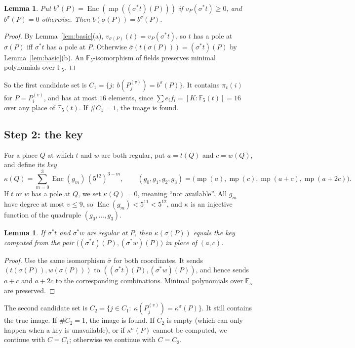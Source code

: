 \documentclass[11pt]{amsart}
\newtheorem{lemma}[theorem]{Lemma}
\theoremstyle{definition}
\theoremstyle{remark}
\newcommand{\F}{\mathbb{F}}
\newcommand{\minpoly}{\operatorname{mp}}
\newcommand{\Enc}{\operatorname{Enc}}
\begin{document}
\begin{lemma}\label{lem:bucket}
Put $b^\sigma(P)=\Enc(\minpoly((\sigma^*t)(P)))$ if $v_P(\sigma^*t)\ge0$, and $b^\sigma(P)=0$ otherwise. Then $b(\sigma(P))=b^\sigma(P)$.
\end{lemma}

\begin{proof}
By Lemma~\ref{lem:basic}(a), $v_{\sigma(P)}(t)=v_P(\sigma^*t)$, so $t$ has a pole at $\sigma(P)$ iff $\sigma^*t$ has a pole at $P$. Otherwise $\bar\sigma(t(\sigma(P)))=(\sigma^*t)(P)$ by Lemma~\ref{lem:basic}(b). An $\F_5$-isomorphism of fields preserves minimal polynomials over $\F_5$.
\end{proof}

So the first candidate set is $C_1=\{j:\ b(P^{(v)}_j)=b^\sigma(P)\}$. It contains $\pi_v(i)$ for $P=P^{(v)}_i$, and has at most $16$ elements, since $\sum e_if_i=[K:\F_5(t)]=16$ over any place of $\F_5(t)$. If $\#C_1=1$, the image is found.

\subsection{Step 2: the key}
For a place $Q$ at which $t$ and $w$ are both regular, put $a=t(Q)$ and $c=w(Q)$, and define its \emph{key}
\[
\kappa(Q)=\sum_{m=0}^{3}\Enc(g_m)\,(5^{12})^{3-m},\qquad (g_0,g_1,g_2,g_3)=\bigl(\minpoly(a),\minpoly(c),\minpoly(a+c),\minpoly(a+2c)\bigr).
\]
If $t$ or $w$ has a pole at $Q$, we set $\kappa(Q)=0$, meaning ``not available''. All $g_m$ have degree at most $v\le9$, so $\Enc(g_m)<5^{11}<5^{12}$, and $\kappa$ is an injective function of the quadruple $(g_0,\dots,g_3)$.

\begin{lemma}\label{lem:key}
If $\sigma^*t$ and $\sigma^*w$ are regular at $P$, then $\kappa(\sigma(P))$ equals the key computed from the pair $\bigl((\sigma^*t)(P),(\sigma^*w)(P)\bigr)$ in place of $(a,c)$.
\end{lemma}

\begin{proof}
Use the same isomorphism $\bar\sigma$ for both coordinates. It sends $(t(\sigma(P)),w(\sigma(P)))$ to $((\sigma^*t)(P),(\sigma^*w)(P))$, and hence sends $a+c$ and $a+2c$ to the corresponding combinations. Minimal polynomials over $\F_5$ are preserved.
\end{proof}

The second candidate set is $C_2=\{j\in C_1:\ \kappa(P^{(v)}_j)=\kappa^\sigma(P)\}$. It still contains the true image. If $\#C_2=1$, the image is found. If $C_2$ is empty (which can only happen when a key is unavailable), or if $\kappa^\sigma(P)$ cannot be computed, we continue with $C=C_1$; otherwise we continue with $C=C_2$.
\end{document}
